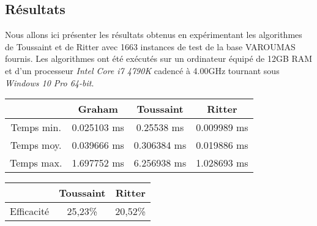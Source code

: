 \subsection{Résultats}
Nous allons ici présenter les résultats obtenus en expérimentant les algorithmes de Toussaint et de Ritter avec 1663 instances de test de la base VAROUMAS fournis. Les algorithmes ont été exécutés sur un ordinateur équipé de 12GB RAM et d'un processeur \textit{Intel Core i7 4790K} cadencé à 4.00GHz tournant sous \textit{Windows 10 Pro 64-bit}.

\begin{center}
\begin{tabular}{|*{4}{c|}}
    \hline
       & Graham  & Toussaint  & Ritter \\
    \hline
     Temps min.  & 0.025103 ms  &0.25538 ms  & 0.009989 ms \\
    \hline
     Temps moy.  & 0.039666 ms  & 0.306384 ms  & 0.019886 ms \\
    \hline
     Temps max.  & 1.697752 ms  & 6.256938 ms & 1.028693 ms \\
    \hline
\end{tabular}
\label{texec}
\end{center}

\begin{figure}[ht]
\begin{center}
\label{gtime}
\end{center}
\end{figure}

\begin{center}
\begin{tabular}{|*{3}{c|}}
    \hline
       & Toussaint  & Ritter \\
    \hline
     Efficacité  & 25,23\%  & 20,52\%  \\
    \hline
\end{tabular}
\label{eff}
\end{center}

